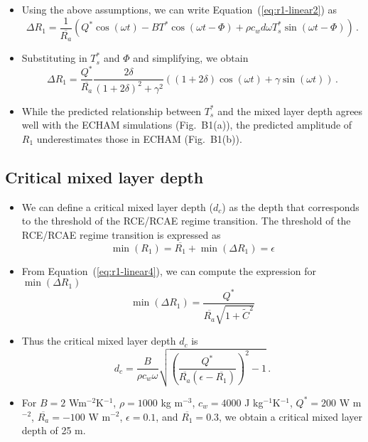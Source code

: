 \documentclass{ametsocV5}
\begin{document}
\begin{itemize}
  \item Using the above assumptions, we can write Equation~(\ref{eq:r1-linear2}) as
        \begin{equation} \label{eq:r1-linear3}
          \Delta R_{1} = \frac{1}{\overline{R_{a}}}\left(Q^{*}\cos(\omega t) -BT^{*}\cos(\omega t - \Phi)+\rho c_{w} d \omega T_{s}^{*}\sin(\omega t - \Phi) \right) \, .
        \end{equation}
  \item Substituting in $T_{s}^{*}$ and $\Phi$ and simplifying, we obtain
        \begin{equation} \label{eq:r1-linear4}
          \Delta R_{1} = \frac{Q^{*}}{\overline{R_{a}}}\frac{2\delta}{(1+2\delta)^{2}+\gamma^{2}}\left((1+2\delta)\cos(\omega t)+\gamma\sin(\omega t)\right) \, .
        \end{equation}
        \item While the predicted relationship between $T_{s}^{*}$ and the mixed layer depth agrees well with the ECHAM simulations (Fig.~B1(a)), the predicted amplitude of $R_{1}$ underestimates those in ECHAM (Fig.~B1(b)).
\end{itemize}

\subsection{Critical mixed layer depth}
\begin{itemize}
  \item We can define a critical mixed layer depth ($d_{c}$) as the depth that corresponds to the threshold of the RCE/RCAE regime transition. The threshold of the RCE/RCAE regime transition is expressed as
        \begin{equation}
          \min(R_{1}) = \overline{R_{1}} + \min(\Delta R_{1}) = \epsilon
        \end{equation}
  \item From Equation~(\ref{eq:r1-linear4}), we can compute the expression for $\min(\Delta R_{1})$
        \begin{equation}
          \min(\Delta R_{1}) = \frac{Q^{*}}{\overline{R_{a}}\sqrt{1+\tilde{C}^{2}}}
        \end{equation}
  \item Thus the critical mixed layer depth $d_{c}$ is
        \begin{equation}
          d_{c} = \frac{B}{\rho c_{w} \omega}\sqrt{\left(\frac{Q^{*}}{\overline{R_{a}}(\epsilon-\overline{R_{1}})}\right)^{2}-1} \, .
        \end{equation}
\item For $B=2$ Wm$^{-2}$K$^{-1}$, $\rho=1000$ kg m$^{-3}$, $c_{w}=4000$ J kg$^{-1} $K$^{-1}$, $Q^{*}=200$ W m$^{-2}$, $\overline{R_{a}}=-100$ W m$^{-2}$, $\epsilon=0.1$, and $\overline{R_{1}}=0.3$, we obtain a critical mixed layer depth of 25 m.

\end{itemize}
\end{document}
